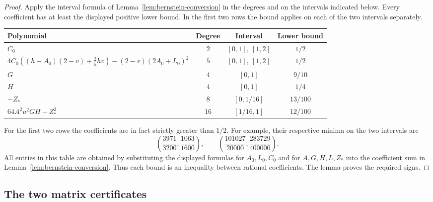 \begin{proof}
Apply the interval formula of Lemma~\ref{lem:bernstein-conversion} in
the degrees and on the intervals indicated below. Every coefficient
has at least the displayed positive lower bound. In the first two rows
the bound applies on each of the two intervals separately.
\begin{center}
\small
\begin{tabular}{@{}lccc@{}}
\toprule
Polynomial & Degree & Interval & Lower bound\\
\midrule
$C_0$ & $2$ & $[0,1],\ [1,2]$ & $1/2$\\
$4C_0((h-A_0)(2-v)+\frac25hv)
 -(2-v)(2A_0+L_0)^2$
 & $5$ & $[0,1],\ [1,2]$ & $1/2$\\
$G$ & $4$ & $[0,1]$ & $9/10$\\
$H$ & $4$ & $[0,1]$ & $1/4$\\
$-Z_*$ & $8$ & $[0,1/16]$ & $13/100$\\
$64A^2u^2GH-Z_*^2$ & $16$ & $[1/16,1]$ & $12/100$\\
\bottomrule
\end{tabular}
\end{center}
For the first two rows the coefficients are in fact strictly greater
than $1/2$. For example, their respective minima on the two intervals are
\[
 \left(\frac{3971}{3200},\frac{1063}{1600}\right),
 \qquad
 \left(\frac{101027}{20000},\frac{283729}{400000}\right).
\]
All entries in this table are obtained by substituting the displayed
formulas for $A_0,L_0,C_0$ and for $A,G,H,L,Z_*$ into the coefficient sum in
Lemma~\ref{lem:bernstein-conversion}. Thus each bound is an inequality
between rational coefficients. The lemma proves the required signs.
\end{proof}

\subsection{The two matrix certificates}

